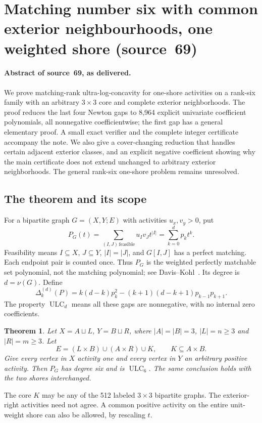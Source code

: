 \documentclass[11pt,a4paper]{article}
\newtheorem{theorem}{Theorem}[section]
\theoremstyle{remark}\newtheorem{remark}[theorem]{Remark}
\newcommand{\ULC}{\operatorname{ULC}}      %
\newcommand{\gap}{\Delta}                  %
\begin{document}
\section{Matching number six with common exterior neighbourhoods, one weighted shore (source~69)}\label{mrn:src:69}
\paragraph{Abstract of source~69, as delivered.} We prove matching-rank ultra-log-concavity for one-shore activities on a rank-six family with an arbitrary $3\times3$ core and complete exterior neighborhoods. The proof reduces the last four Newton gaps to 8,964 explicit univariate coefficient polynomials, all nonnegative coefficientwise; the first gap has a general elementary proof. A small exact verifier and the complete integer certificate accompany the note. We also give a cover-changing reduction that handles certain adjacent exterior classes, and an explicit negative coefficient showing why the main certificate does not extend unchanged to arbitrary exterior neighborhoods. The general rank-six one-shore problem remains unresolved.

\subsection{The theorem and its scope}
For a bipartite graph $G=(X,Y;E)$ with activities $u_x,v_y>0$, put
\[
 P_G(t)=\sum_{(I,J)\,\mathrm{feasible}}u_Iv_Jt^{|I|}
       =\sum_{k=0}^{d}p_kt^k.
\]
Feasibility means $I\subseteq X$, $J\subseteq Y$, $|I|=|J|$, and $G[I,J]$ has a perfect matching. Each endpoint pair is counted once. Thus $P_G$ is the weighted perfectly matchable set polynomial, not the matching polynomial; see Davis--Kohl~\cite{b:DK}. Its degree is $d=\nu(G)$. Define
\begin{equation}\label{mrn:s:ce:eq:gap}
 \gap_k^{(d)}(P)=k(d-k)p_k^2-(k+1)(d-k+1)p_{k-1}p_{k+1}.
\end{equation}
The property $\ULC_d$ means all these gaps are nonnegative, with no internal zero coefficients.

\begin{theorem}\label{mrn:s:ce:thm:main}
Let $X=A\sqcup L$, $Y=B\sqcup R$, where $|A|=|B|=3$, $|L|=n\ge3$ and $|R|=m\ge3$. Let
\[
 E=(L\times B)\cup(A\times R)\cup K,
 \qquad K\subseteq A\times B.
\]
Give every vertex in $X$ activity one and every vertex in $Y$ an arbitrary positive activity. Then $P_G$ has degree six and is $\ULC_6$. The same conclusion holds with the two shores interchanged.
\end{theorem}
The core $K$ may be any of the 512 labeled $3\times3$ bipartite graphs. The exterior-right activities need not agree. A common positive activity on the entire unit-weight shore can also be allowed, by rescaling $t$.
\end{document}
